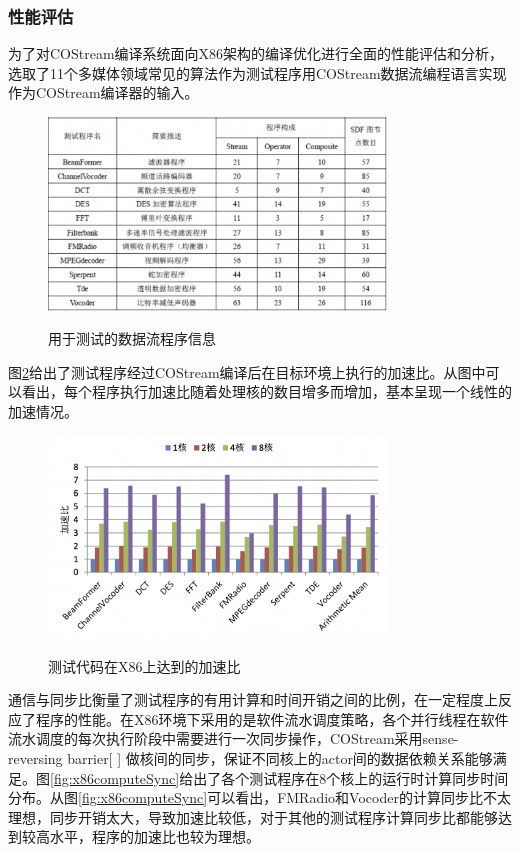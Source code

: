 \subsubsection{性能评估}
为了对COStream编译系统面向X86架构的编译优化进行全面的性能评估和分析，选取了11个多媒体领域常见的算法作为测试程序用COStream数据流编程语言实现作为COStream编译器的输入。
\begin{figure}[htbp]
  \centering
  \includegraphics[width=0.8\textwidth]{Img/Chap_Application/Yu/x86benchmark.png}\\
  \caption{用于测试的数据流程序信息}\label{fig:x86benchmark}
\end{figure}

图\ref{fig:x86ratio}给出了测试程序经过COStream编译后在目标环境上执行的加速比。从图中可以看出，每个程序执行加速比随着处理核的数目增多而增加，基本呈现一个线性的加速情况。
\begin{figure}[htbp]
  \centering
  \includegraphics[width=0.8\textwidth]{Img/Chap_Application/Yu/x86ratio.png}\\
  \caption{测试代码在X86上达到的加速比}\label{fig:x86ratio}
\end{figure}

通信与同步比衡量了测试程序的有用计算和时间开销之间的比例，在一定程度上反应了程序的性能。在X86环境下采用的是软件流水调度策略，各个并行线程在软件流水调度的每次执行阶段中需要进行一次同步操作，COStream采用sense-reversing barrier[ ] 做核间的同步，保证不同核上的actor间的数据依赖关系能够满足。图\ref{fig:x86computeSync}给出了各个测试程序在8个核上的运行时计算同步时间分布。从图\ref{fig:x86computeSync}可以看出，FMRadio和Vocoder的计算同步比不太理想，同步开销太大，导致加速比较低，对于其他的测试程序计算同步比都能够达到较高水平，程序的加速比也较为理想。

